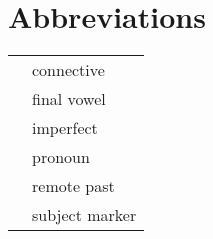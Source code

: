 \documentclass[output=paper,colorlinks,citecolor=brown,
]{langscibook}
\begin{document}
\section*{Abbreviations}
\begin{tabular}{@{}ll@{}}
\Conn{} & connective\\
\Fv{} & final vowel\\
\Impf{} & imperfect\\
\Pro{} & pronoun\\
\Rpst{} & remote past\\
\Sm{} & subject marker
\end{tabular}



\end{document}
